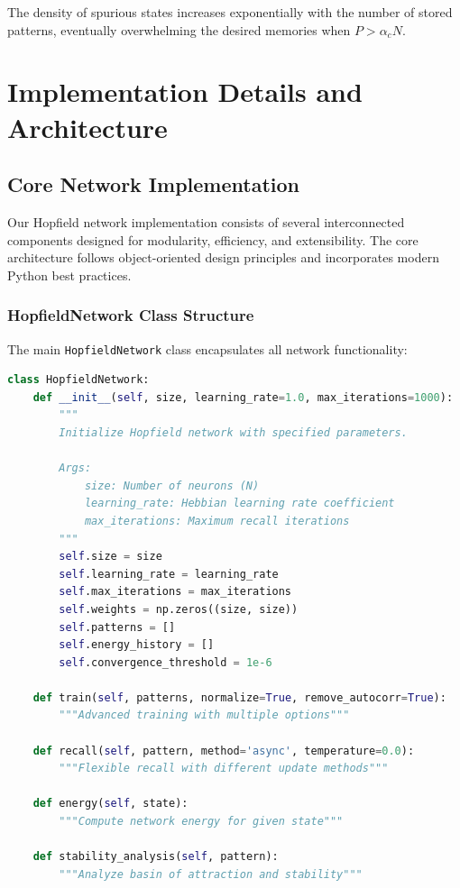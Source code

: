 \documentclass[11pt,a4paper]{article}
\begin{document}
The density of spurious states increases exponentially with the number of stored patterns, eventually overwhelming the desired memories when $P > \alpha_c N$.

\section{Implementation Details and Architecture}

\subsection{Core Network Implementation}

Our Hopfield network implementation consists of several interconnected components designed for modularity, efficiency, and extensibility. The core architecture follows object-oriented design principles and incorporates modern Python best practices.

\subsubsection{HopfieldNetwork Class Structure}

The main \texttt{HopfieldNetwork} class encapsulates all network functionality:

\begin{lstlisting}[language=Python, caption=Core HopfieldNetwork Class Structure]
class HopfieldNetwork:
    def __init__(self, size, learning_rate=1.0, max_iterations=1000):
        """
        Initialize Hopfield network with specified parameters.
        
        Args:
            size: Number of neurons (N)
            learning_rate: Hebbian learning rate coefficient
            max_iterations: Maximum recall iterations
        """
        self.size = size
        self.learning_rate = learning_rate
        self.max_iterations = max_iterations
        self.weights = np.zeros((size, size))
        self.patterns = []
        self.energy_history = []
        self.convergence_threshold = 1e-6
        
    def train(self, patterns, normalize=True, remove_autocorr=True):
        """Advanced training with multiple options"""
        
    def recall(self, pattern, method='async', temperature=0.0):
        """Flexible recall with different update methods"""
        
    def energy(self, state):
        """Compute network energy for given state"""
        
    def stability_analysis(self, pattern):
        """Analyze basin of attraction and stability"""
\end{lstlisting}
\end{document}
